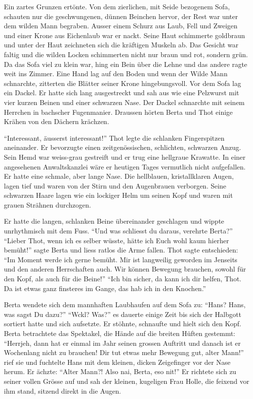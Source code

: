 \documentclass[11pt,titlepage,a5paper]{book}
\begin{document}
Ein zartes Grunzen ertönte. Von dem zierlichen, mit Seide bezogenem Sofa, schauten nur die geschwungenen, dünnen Beinchen hervor, der Rest war unter  dem wilden Mann begraben. Ausser einem Schurz aus Laub, Fell und Zweigen und einer Krone aus Eichenlaub war er nackt. Seine Haut schimmerte goldbraun und unter der Haut zeichneten sich die kräftigen Muskeln ab. Das Gesicht war faltig und die wilden Locken schimmerten nicht nur braun und rot, sondern grün. Da das Sofa viel zu klein war, hing ein Bein über die Lehne und das andere ragte weit ins Zimmer. Eine Hand lag auf den Boden und wenn der Wilde Mann schnarchte, zitterten die Blätter seiner Krone hingebungsvoll. Vor dem Sofa lag ein Dackel. Er hatte sich lang ausgestreckt und sah aus wie eine Pelzwurst mit vier kurzen Beinen und einer schwarzen Nase. Der Dackel schnarchte mit seinem Herrchen in bachscher Fugenmanier. Draussen hörten Berta und Thot einige Krähen von den Dächern krächzen.
 
"`Interessant, äusserst interessant!"' Thot legte die schlanken Fingerspitzen aneinander. Er bevorzugte einen zeitgenössischen, schlichten, schwarzen Anzug. Sein Hemd war weiss-grau gestreift und er trug eine hellgraue Krawatte. In einer angesehenen Anwaltskanzlei wäre er heutigen Tages vermutlich nicht aufgefallen. Er hatte eine schmale, aber lange Nase. Die hellblauen, kristallklaren Augen, lagen tief und waren von der Stirn und den Augenbrauen verborgen. Seine schwarzen Haare lagen wie ein lockiger Helm um seinen Kopf und waren mit grauen Strähnen durchzogen. 

Er hatte die langen, schlanken Beine übereinander geschlagen und wippte unrhythmisch mit dem Fuss. "`Und was schliesst du daraus, verehrte Berta?"' "`Lieber Thot, wenn ich es selber wüsste, hätte ich Euch wohl kaum hierher bemüht!"' sagte Berta und liess ratlos die Arme fallen. Thot sagte entschieden: "`Im Moment werde ich gerne bemüht. Mir ist langweilig geworden im Jenseits und den anderen Herrschaften auch. Wir können Bewegung brauchen, sowohl für den Kopf, als auch für die Beine!"' "`Ich bin sicher, da kann ich dir helfen, Thot. Da ist etwas ganz finsteres im Gange, das hab ich in den Knochen."' 

Berta wendete sich dem mannhaften Laubhaufen auf dem Sofa zu: "`Hans? Hans, was sagst Du dazu?"' "`Wckl? Was?"' es dauerte einige Zeit bis sich der Halbgott sortiert hatte und sich aufsetzte. Er stöhnte, schnaufte und hielt sich den Kopf. Berta betrachtete das Spektakel, die Hände auf die breiten Hüften gestemmt:  "`Herrjeh, dann hat er einmal im Jahr seinen grossen Auftritt und danach ist er Wochenlang nicht zu brauchen! Dir tut etwas mehr Bewegung gut, alter Mann!"' rief sie und fuchtelte Hans mit dem kleinen, dicken Zeigefinger vor der Nase herum. Er ächzte: "`Alter Mann?! Also nai, Berta, eso nit!"' Er richtete sich zu seiner vollen Grösse auf und sah der kleinen, kugeligen Frau Holle, die feixend vor ihm stand, sitzend direkt in die Augen.
\end{document}

